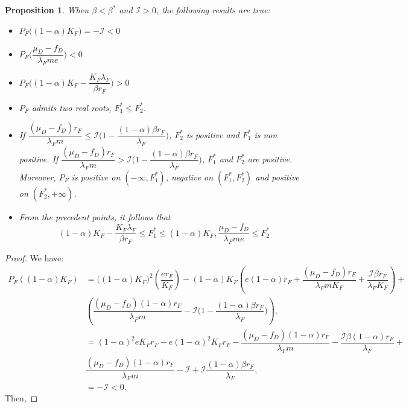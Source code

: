 \documentclass{article}
\newcommand{\lfw}{\lambda_{F}}
\newcommand{\lfw}{\lambda_{F}}
\newcommand{\cI}{\mathcal{I}}
\newtheorem{prop}[theorem]{Proposition}
\theoremstyle{definition}
\theoremstyle{remark}
\begin{document}
\begin{appendix}
\begin{prop}\label{prop:study of PF}
When $\beta < \beta^*$ and $\cI > 0$, the following results are true:
\begin{itemize}
\item $P_F\Big((1-\alpha)K_F\Big) = -\cI < 0$
\item $P_F\Big(\dfrac{\mu_D - f_D}{\lfw m e}\Big) < 0$
\item $P_F\Big((1-\alpha)K_F - \dfrac{K_F \lfw}{\beta r_F}\Big) > 0$
\item $P_F$ admits two real roots, $F_1^* \leq F_2^*$. 
\item If $\dfrac{(\mu_D - f_D) r_F}{\lfw m } \leq \cI\Big(1 - \dfrac{(1-\alpha)\beta r_F}{\lfw} \Big)$,  $F_2^*$ is positive and $F_1^*$ is non positive. If $\dfrac{(\mu_D - f_D) r_F}{\lfw m } > \cI\Big(1 - \dfrac{(1-\alpha)\beta r_F}{\lfw} \Big)$, $F^*_1$ and $F^*_2$ are positive. Moreover, $P_F$ is positive on $(-\infty, F_1^*)$, negative on $(F^*_1, F^*_2)$ and positive on $(F^*_2, +\infty)$.
\item From the precedent points, it follows that $$(1-\alpha)K_F - \dfrac{K_F \lfw}{\beta r_F} \leq F^*_1 \leq (1-\alpha)K_F, \dfrac{\mu_D - f_D}{\lfw m e} \leq F_2^* $$
\end{itemize}

\end{prop}

\begin{proof}
We have:
\begin{align*}
P_F((1-\alpha) K_F) &= \Big((1-\alpha) K_F \Big)^2 \left(\dfrac{er_F}{K_F} \right) - (1-\alpha) K_F \left(e(1-\alpha)r_F + \dfrac{(\mu_D - f_D) r_F}{\lfw m K_F} + \dfrac{\cI \beta r_F}{\lfw K_F} \right) + \\ &\left(\dfrac{(\mu_D - f_D)(1-\alpha) r_F}{\lfw m} - \cI\Big(1 - \dfrac{(1-\alpha)\beta r_F}{\lfw} \Big) \right), \\
&=(1-\alpha)^2 e K_F r_F - e(1-\alpha)^2 K_F r_F - \dfrac{(\mu_D - f_D) (1-\alpha) r_F}{\lfw m} - \dfrac{\cI \beta (1-\alpha)r_F}{\lfw}  + \\ &\dfrac{(\mu_D - f_D)(1-\alpha) r_F}{\lfw m} - \cI +\cI \dfrac{(1-\alpha)\beta r_F}{\lfw}, \\
&= -\cI< 0.
\end{align*}
Then, 


\end{proof}
\end{appendix}
\end{document}
